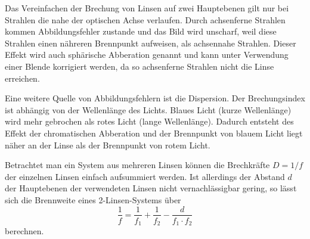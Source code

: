 Das Vereinfachen der Brechung von Linsen auf zwei Hauptebenen gilt nur bei Strahlen die nahe der optischen Achse verlaufen.
Durch achsenferne Strahlen kommen Abbildungsfehler zustande und das Bild wird unscharf, weil diese Strahlen einen nähreren Brennpunkt aufweisen, als achsennahe Strahlen.
Dieser Effekt wird auch sphärische Abberation genannt und kann unter Verwendung einer Blende korrigiert werden, da so achsenferne Strahlen nicht die Linse erreichen.

Eine weitere Quelle von Abbildungsfehlern ist die Dispersion.
Der Brechungsindex ist abhängig von der Wellenlänge des Lichts.
Blaues Licht (kurze Wellenlänge) wird mehr gebrochen als rotes Licht (lange Wellenlänge).
Dadurch entsteht des Effekt der chromatischen Abberation und der Brennpunkt von blauem Licht liegt näher an der Linse als der Brennpunkt von rotem Licht.

Betrachtet man ein System aus mehreren Linsen können die Brechkräfte $D=1/f$ der einzelnen Linsen einfach aufsummiert werden.
Ist allerdings der Abstand $d$ der Hauptebenen der verwendeten Linsen nicht vernachlässigbar gering, so lässt sich die Brennweite eines 2-Linsen-Systems über
\begin{equation}
    \frac{1}{f} = \frac{1}{f_1} + \frac{1}{f_2} - \frac{d}{f_1 \cdot f_2}
    \label{eq:2linsen}
\end{equation}
berechnen.